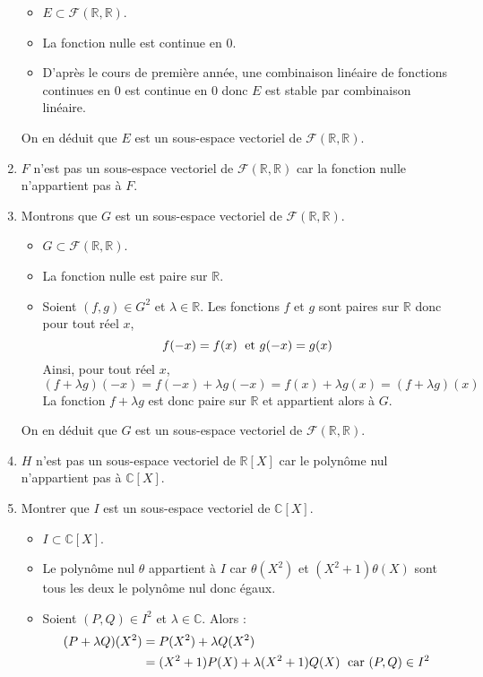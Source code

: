 \documentclass[a4paper,10pt]{report}
\begin{document}
\begin{enumerate}
\begin{itemize}
\item $E \subset \mathcal{F}(\mathbb{R}, \mathbb{R})$.
\item La fonction nulle est continue en $0$.
\item D'après le cours de première année, une combinaison linéaire de fonctions continues en $0$ est continue en $0$ donc $E$ est stable par combinaison linéaire.
\end{itemize}
On en déduit que $E$ est un sous-espace vectoriel de $\mathcal{F}(\mathbb{R}, \mathbb{R})$.
\item $F$ n'est pas un sous-espace vectoriel de $\mathcal{F}(\mathbb{R}, \mathbb{R})$ car la fonction nulle n'appartient pas à $F$.
\newpage
\item Montrons que $G$ est un sous-espace vectoriel de $\mathcal{F}(\mathbb{R}, \mathbb{R})$.
\begin{itemize}
\item $G \subset \mathcal{F}(\mathbb{R}, \mathbb{R})$.
\item La fonction nulle est paire sur $\mathbb{R}$.
\item Soient $(f,g) \in G^2$ et $\lambda \in \mathbb{R}$. Les fonctions $f$ et $g$ sont paires sur $\mathbb{R}$ donc pour tout réel $x$,
$$ f(-x) = f(x) \; \hbox{ et } g(-x)=g(x)$$
Ainsi, pour tout réel $x$,
$$ (f+ \lambda g)(-x) = f(-x) + \lambda g(-x)= f(x) + \lambda g(x) = (f+ \lambda g)(x)$$
La fonction $f + \lambda g$ est donc paire sur $\mathbb{R}$ et appartient alors à $G$.
\end{itemize}
On en déduit que $G$ est un sous-espace vectoriel de $\mathcal{F}(\mathbb{R}, \mathbb{R})$.
\item $H$ n'est pas un sous-espace vectoriel de $\mathbb{R}[X]$ car le polynôme nul n'appartient pas à $\mathbb{C}[X]$.
\item Montrer que $I$ est un sous-espace vectoriel de $\mathbb{C}[X]$.
\begin{itemize}
\item $I \subset \mathbb{C}[X]$.
\item Le polynôme nul $\theta$ appartient à $I$ car $\theta(X^2)$ et $(X^2+1) \theta(X)$ sont tous les deux le polynôme nul donc égaux. 
\item Soient $(P,Q) \in I^2$ et $\lambda \in \mathbb{C}$. Alors :
\begin{align*}
(P + \lambda Q)(X^2)  & = P(X^2) + \lambda Q(X^2) \\
& = (X^2+1) P(X) + \lambda (X^2+1) Q(X) \; \hbox{ car } (P,Q) \in I^2 \\

\end{align*}
\end{itemize}
\end{enumerate}
\end{document}
